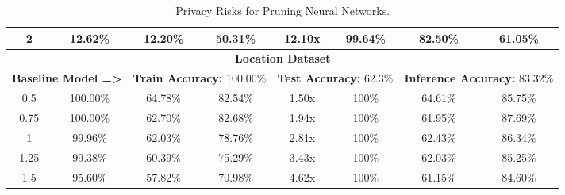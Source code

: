 \begin{table*}[!htb]
\begin{center}
\begin{tabular}{|c|c|c|c|c|c|c|c|}
2 & 12.62\% & 12.20\% & \cellcolor{green!25}50.31\% & 12.10x & 99.64\% & 82.50\% & \cellcolor{red!25}61.05\%\\
\hline
\hline
\multicolumn{8}{|c|}{\textbf{Location Dataset}}\\
\multicolumn{2}{|c}{\textbf{Baseline Model =>}} & \multicolumn{2}{c}{\textbf{Train Accuracy:} 100.00\%} & \multicolumn{2}{c}{\textbf{Test Accuracy:} 62.3\%} & \multicolumn{2}{c|}{\textbf{Inference Accuracy:} 83.32\%}\\
\hline
0.5 & 100.00\% & 64.78\% & \cellcolor{green!25}82.54\% & 1.50x & 100\% & 64.61\% & \cellcolor{red!25}85.75\%\\
0.75 & 100.00\% & 62.70\% & \cellcolor{green!25}82.68\% & 1.94x & 100\% & 61.95\% & \cellcolor{red!25}87.69\%\\
1 & 99.96\% & 62.03\% & \cellcolor{green!25}78.76\% & 2.81x & 100\% & 62.43\% & \cellcolor{red!25}86.34\%\\
1.25 & 99.38\% & 60.39\% & \cellcolor{green!25}75.29\% & 3.43x & 100\% & 62.03\% & \cellcolor{red!25}85.25\%\\
1.5 & 95.60\% & 57.82\% & \cellcolor{green!25}70.98\% & 4.62x & 100\% & 61.15\% & \cellcolor{red!25}84.60\%\\
\hline
\end{tabular}
\end{center}
\caption{Privacy Risks for Pruning Neural Networks.}
\label{fmnist_pruning}
\end{table*}
